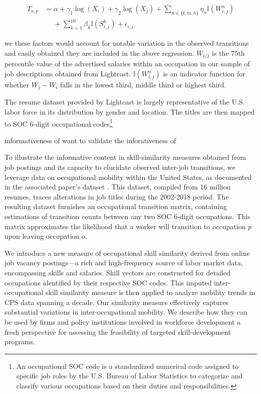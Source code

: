 \documentclass{article}
\begin{document}
\begin{equation}
\begin{split}
T_{o,p} & = \alpha + \gamma_{1}\log(X_i) + \gamma_{2}\log(X_j) + \sum_{n \in \{l,m,h\}} \eta_n\mathbb{I}(W_{i,j}^n) \\
&\phantom{{}=} + \sum_{k=1}^{10} \beta_k\mathbb{I}(S_{i,j}^k) + \epsilon_{i,j}
\end{split}
\end{equation}

we these factors would account for notable variation in the observed transitions and easily obtained they are included in the above regression.  $W_{i/j}$ is the 75th percentile value of the advertised salaries within an occupation in our sample of job descriptions obtained from Lightcast. $\mathbb{I}(W_{i,j}^n)$ is an indicator function for whether $W_j - W_i$ falls in the lowest third, middle third or highest third.





The resume dataset provided by Lightcast is largely representative of the U.S. labor force in its distribution by gender and location. The titles are then mapped to SOC 6-digit occupational codes\footnote{An occupational SOC code is a standardized numerical code assigned to specific job roles by the U.S. Bureau of Labor Statistics to categorize and classify various occupations based on their duties and responsibilities.} 

informativeness of want to validate the inforativeness of 

To illustrate the informative content in skill-similarity measures obtained from job postings and its capacity to elucidate observed inter-job transitions, we leverage data on occupational mobility within the United States, as documented in the associated paper's dataset \autocite{schubert2022employer}. This dataset, compiled from 16 million resumes, traces alterations in job titles during the 2002-2018 period. The resulting dataset furnishes an occupational transition matrix, containing estimations of transition counts between any two SOC 6-digit occupations. This matrix approximates the likelihood that a worker will transition to occupation $p$ upon leaving occupation $o$.






We introduce a new measure of occupational skill similarity derived from online job vacancy postings—a rich and high-frequency source of labor market data, encompassing skills and salaries. Skill vectors are constructed for detailed occupations identified by their respective SOC codes. This imputed inter-occupational skill similarity measure is then applied to analyze mobility trends in CPS data spanning a decade. Our similarity measure effectively captures substantial variations in inter-occupational mobility. We describe how they can be used by firms and policy institutions involved in workforce development a fresh perspective for assessing the feasibility of targeted skill-development programs.
\end{document}
